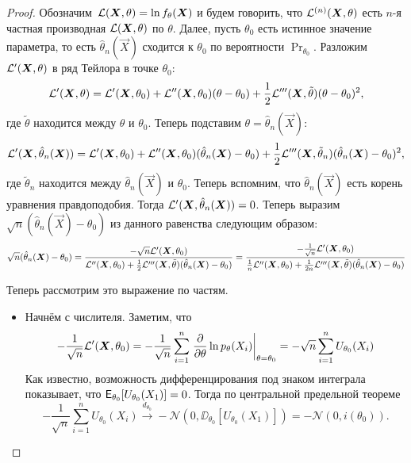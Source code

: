 \begin{proof}
    Обозначим $\mathcal{L}(\bm{X}, \theta) = \ln f_{\theta}(\bm{X})$ и будем говорить, что $\mathcal{L}^{(n)}(\bm{X}, \theta)$ есть $n$-я частная производная $\mathcal{L}(\bm{X}, \theta)$ по $\theta$. Далее, пусть $\theta_{0}$ есть истинное значение параметра, то есть $\hat{\theta}_{n}(\vec{X})$ сходится к $\theta_{0}$ по вероятности $\Pr_{\theta_{0}}$. Разложим $\mathcal{L}'(\bm{X}, \theta)$ в ряд Тейлора в точке $\theta_{0}$:
    \[
        \mathcal{L}'(\bm{X}, \theta) 
        = \mathcal{L}'(\bm{X}, \theta_{0}) + \mathcal{L}''(\bm{X}, \theta_{0})(\theta - \theta_{0}) + \frac{1}{2}\mathcal{L}'''(\bm{X}, \tilde{\theta})(\theta - \theta_{0})^{2},
    \]
    где $\tilde{\theta}$ находится между $\theta$ и $\theta_{0}$. Теперь подставим $\theta = \hat{\theta}_{n}(\vec{X})$:
    \[
        \mathcal{L}'(\bm{X}, \hat{\theta}_{n}(\bm{X}))
        = \mathcal{L}'(\bm{X}, \theta_{0}) + \mathcal{L}''(\bm{X}, \theta_{0})(\hat{\theta}_{n}(\bm{X}) - \theta_{0}) + \frac{1}{2}\mathcal{L}'''(\bm{X}, \tilde{\theta}_{n})(\hat{\theta}_{n}(\bm{X}) - \theta_{0})^{2},
    \]
    где $\tilde{\theta}_{n}$ находится между $\hat{\theta}_{n}(\vec{X})$ и $\theta_{0}$. Теперь вспомним, что $\hat{\theta}_{n}(\vec{X})$ есть корень уравнения правдоподобия. Тогда $\mathcal{L}'(\bm{X}, \hat{\theta}_{n}(\bm{X})) = 0$. Теперь выразим $\sqrt{n}(\hat{\theta}_{n}(\vec{X}) - \theta_{0})$ из данного равенства следующим образом:
    \[
        \sqrt{n}(\hat{\theta}_{n}(\bm{X}) - \theta_{0}) 
        = \frac{-\sqrt{n}\mathcal{L}'(\bm{X}, \theta_{0})}{\mathcal{L}''(\bm{X}, \theta_{0}) + \frac{1}{2}\mathcal{L}'''(\bm{X}, \tilde{\theta})(\hat{\theta}_{n}(\bm{X}) - \theta_{0})}
        = \frac{-\frac{1}{\sqrt{n}}\mathcal{L}'(\bm{X}, \theta_{0})}{\frac{1}{n}\mathcal{L}''(\bm{X}, \theta_{0}) + \frac{1}{2n}\mathcal{L}'''(\bm{X}, \tilde{\theta})(\hat{\theta}_{n}(\bm{X}) - \theta_{0})}
    \]

    Теперь рассмотрим это выражение по частям.
    \begin{itemize}
        \item Начнём с числителя. Заметим, что
        \[
            -\frac{1}{\sqrt{n}}\mathcal{L}'(\bm{X}, \theta_{0}) = -\frac{1}{\sqrt{n}}\sum_{i = 1}^{n} \left.\pdv{\theta}\ln p_{\theta}(X_{i})\right|_{\theta = \theta_{0}} = -\sqrt{n}\sum_{i = 1}^{n} U_{\theta_{0}}(X_{i})
        \]
        Как известно, возможность дифференцирования под знаком интеграла показывает, что $\operatorname{\mathsf{E}}_{\theta_{0}}[U_{\theta_{0}}(X_{1})] = 0$. Тогда по центральной предельной теореме
        \[
            -\frac{1}{\sqrt{n}}\sum_{i = 1}^{n} U_{\theta_{0}}(X_{i}) \xrightarrow{d_{\theta_{0}}} -\mathcal{N}\left(0,\DD_{\theta_{0}}[U_{\theta_{0}}(X_{1})]\right) = -\mathcal{N}(0, i(\theta_{0})).
        \]


\end{itemize}
\end{proof}
